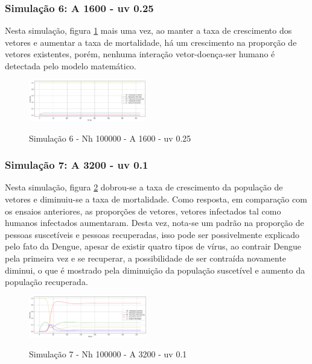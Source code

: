 \documentclass[conference]{IEEEtran}
\begin{document}
\subsubsection{Simulação 6: A 1600 - uv 0.25}

Nesta simulação, figura \ref{fig:s6} mais uma vez, ao manter a taxa de crescimento dos vetores e aumentar a taxa de mortalidade, há um crescimento na proporção de vetores existentes, porém, nenhuma interação vetor-doença-ser humano é detectada pelo modelo matemático.
\\

\begin{figure}[!ht]
  \caption{Simulação 6 - Nh 100000 - A 1600 - uv 0.25}
  \includegraphics[width=0.46\textwidth]{Graf6.png}
      \label{fig:s6}
\end{figure}

\subsubsection{Simulação 7: A 3200 - uv 0.1}

Nesta simulação, figura  \ref{fig:s7} dobrou-se a taxa de crescimento da população de vetores e diminuiu-se a taxa de mortalidade. Como resposta, em comparação com os ensaios anteriores, as proporções de vetores, vetores infectados tal como humanos infectados aumentaram. Desta vez, nota-se um padrão na proporção de pessoas suscetíveis e pessoas recuperadas, isso pode ser possivelmente explicado pelo fato da Dengue, apesar de existir quatro tipos de vírus, ao contrair Dengue pela primeira vez e se recuperar, a possibilidade de ser contraída novamente diminui, o que é mostrado pela diminuição da população suscetível e aumento da população recuperada.
\\

\begin{figure}[!ht]
  \caption{Simulação 7 - Nh 100000 - A 3200 - uv 0.1}
  \includegraphics[width=0.46\textwidth]{Graf7.png}
  \label{fig:s7}
\end{figure}
\end{document}
